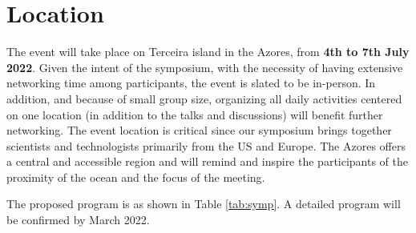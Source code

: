 \section{Location}

The event will take place on Terceira island in the Azores, from
\textbf{4th to 7th July 2022}. Given the intent of the symposium, with
the necessity of having extensive networking time among participants,
the event is slated to be in-person. In addition, and because of small
group size, organizing all daily activities centered on one location
(in addition to the talks and discussions) will benefit further
networking. The event location is critical since our symposium brings
together scientists and technologists primarily from the US and
Europe. The Azores offers a central and accessible region and will
remind and inspire the participants of the proximity of the ocean and
the focus of the meeting.

\noindent
The proposed program is as shown in Table \ref{tab:symp}. A detailed
program will be confirmed by March 2022.


